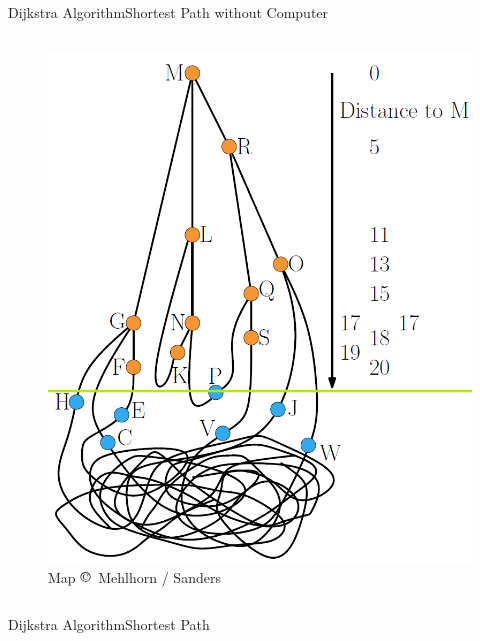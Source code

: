 \begin{frame}{Dijkstra Algorithm}{Shortest Path without Computer}
\begin{columns}
\begin{column}{0.45\linewidth}
\begin{figure}[!t]
        \includegraphics[width=\linewidth]
          {Images/Dijkstra/DijkstraTree_WithOverlay}
        \vspace{-0.5em}
        \caption{Map $\copyright\,$ Mehlhorn / Sanders}
      \end{figure}
    \end{column}
  \end{columns}
\end{frame}



\begin{frame}{Dijkstra Algorithm}{Shortest Path}
  
\end{frame}